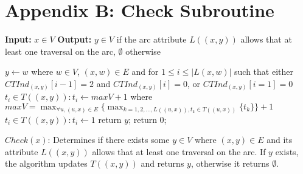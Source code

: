 \section*{Appendix B: Check Subroutine}
\begin{algorithm} 
    \begin{algorithmic}
        \State \textbf{Input:} $x \in V$
        \State \textbf{Output:} $y \in V$ if the arc attribute $L((x,y))$ allows that at least one traversal on the arc, $\emptyset$ otherwise
    \end{algorithmic}
    \begin{algorithmic}[1]
        \State $y \gets w$ where $w \in V$, $(x,w) \in E$ and for $1 \leq i \leq |L(x,w)|$ such that either $CTInd_{(x,y)}[i-1] = 2$ and $CTInd_{(x,y)}[i] = 0$, or $CTInd_{(x,y)}[i=1] = 0$\;
                \State $t_i \in T((x,y)): t_i \gets maxV + 1$ where $maxV = \displaystyle\max_{\forall u, (u,x) \in E} \{{\displaystyle\max_{k=1, 2, \ldots, L((u,x)),  t_k \in T((u,x))}{\{t_k\}}}\} + 1$\;
            \Else
                \State $t_i \in T((x,y)): t_i \gets 1$\;
            \EndIf
            \State return $y$;
        \Else
            \State return $0$;
        \EndIf
    \end{algorithmic}
   \caption{$Check(x)$: Determines if there exists some $y \in V$ where $(x,y) \in E$ and its attribute $L((x,y))$ allows that at least one traversal on the arc. If $y$ exists, the algorithm updates $T((x,y))$ and returns $y$, otherwise it returns $\emptyset$.}
   \label{alg:Check}
\end{algorithm}
